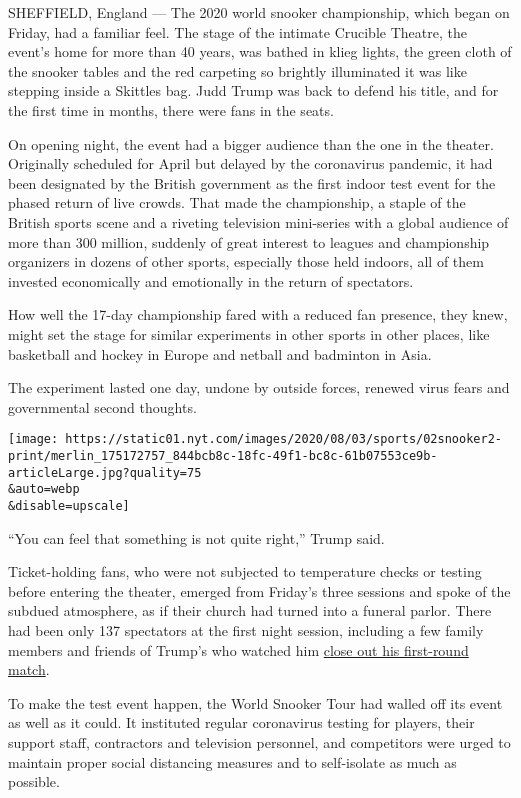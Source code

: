 SHEFFIELD, England --- The 2020 world snooker championship, which began
on Friday, had a familiar feel. The stage of the intimate Crucible
Theatre, the event's home for more than 40 years, was bathed in klieg
lights, the green cloth of the snooker tables and the red carpeting so
brightly illuminated it was like stepping inside a Skittles bag. Judd
Trump was back to defend his title, and for the first time in months,
there were fans in the seats.

On opening night, the event had a bigger audience than the one in the
theater. Originally scheduled for April but delayed by the coronavirus
pandemic, it had been designated by the British government as the first
indoor test event for the phased return of live crowds. That made the
championship, a staple of the British sports scene and a riveting
television mini-series with a global audience of more than 300 million,
suddenly of great interest to leagues and championship organizers in
dozens of other sports, especially those held indoors, all of them
invested economically and emotionally in the return of spectators.

How well the 17-day championship fared with a reduced fan presence, they
knew, might set the stage for similar experiments in other sports in
other places, like basketball and hockey in Europe and netball and
badminton in Asia.

The experiment lasted one day, undone by outside forces, renewed virus
fears and governmental second thoughts.

\texttt{[image: https://static01.nyt.com/images/2020/08/03/sports/02snooker2-print/merlin\_175172757\_844bcb8c-18fc-49f1-bc8c-61b07553ce9b-articleLarge.jpg?quality=75\\\&auto=webp\\\&disable=upscale]}

``You can feel that something is not quite right,'' Trump said.

Ticket-holding fans, who were not subjected to temperature checks or
testing before entering the theater, emerged from Friday's three
sessions and spoke of the subdued atmosphere, as if their church had
turned into a funeral parlor. There had been only 137 spectators at the
first night session, including a few family members and friends of
Trump's who watched him
\href{http://livescores.worldsnookerdata.com/Matches/Result/14139/764763/betfred-world-championship-2020}{close
out his first-round match}.

To make the test event happen, the World Snooker Tour had walled off its
event as well as it could. It instituted regular coronavirus testing for
players, their support staff, contractors and television personnel, and
competitors were urged to maintain proper social distancing measures and
to self-isolate as much as possible.

